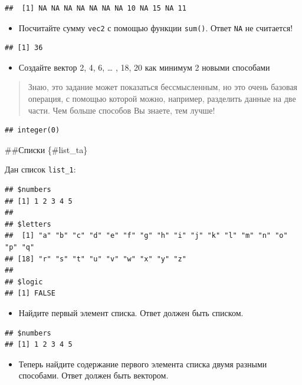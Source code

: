 \documentclass[]{book}
\providecommand{\tightlist}{%
  \setlength{\itemsep}{0pt}\setlength{\parskip}{0pt}}
\begin{document}
\begin{verbatim}
##  [1] NA NA NA NA NA NA NA 10 NA 15 NA 11
\end{verbatim}

\begin{itemize}
\tightlist
\item
  Посчитайте сумму \texttt{vec2} с помощью функции \texttt{sum()}. Ответ \texttt{NA} не считается!
\end{itemize}

\begin{verbatim}
## [1] 36
\end{verbatim}

\begin{itemize}
\tightlist
\item
  Создайте вектор 2, 4, 6, \ldots{} , 18, 20 как минимум 2 новыми способами
\end{itemize}

\begin{quote}
Знаю, это задание может показаться бессмысленным, но это очень базовая операция, с помощью которой можно, например, разделить данные на две части. Чем больше способов Вы знаете, тем лучше!
\end{quote}

\begin{verbatim}
## integer(0)
\end{verbatim}

\#\#Списки \{\#list\_ta\}

Дан список \texttt{list\_1}:

\begin{verbatim}
## $numbers
## [1] 1 2 3 4 5
## 
## $letters
##  [1] "a" "b" "c" "d" "e" "f" "g" "h" "i" "j" "k" "l" "m" "n" "o" "p" "q"
## [18] "r" "s" "t" "u" "v" "w" "x" "y" "z"
## 
## $logic
## [1] FALSE
\end{verbatim}

\begin{itemize}
\tightlist
\item
  Найдите первый элемент списка. Ответ должен быть списком.
\end{itemize}

\begin{verbatim}
## $numbers
## [1] 1 2 3 4 5
\end{verbatim}

\begin{itemize}
\tightlist
\item
  Теперь найдите содержание первого элемента списка двумя разными способами. Ответ должен быть вектором.
\end{itemize}
\end{document}
